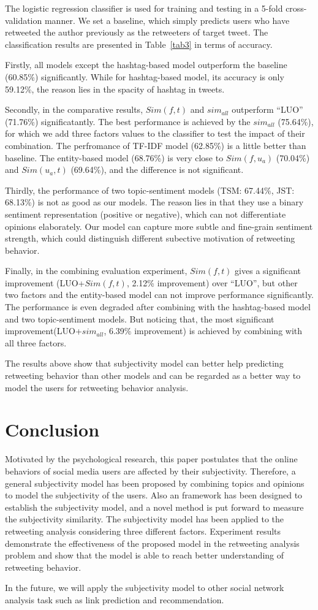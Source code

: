 \documentclass[letterpaper]{article}
\begin{document}
The logistic regression classifier is used for training and testing in a 5-fold cross-validation manner.
We set a baseline, which simply predicts users who have retweeted the author previously as the retweeters of target tweet. 
The classification results are presented in Table~\ref{tab3} in terms of accuracy.

Firstly, all models except the hashtag-based model outperform the baseline (60.85\%) significantly. While for hashtag-based model, its accuracy is only 59.12\%, the reason lies in the spacity of hashtag in tweets. 

Secondly, in the comparative results, $ Sim(f,t) $ and $ sim_{all}  $ outperform ``LUO'' (71.76\%) significatantly.
The best performance is achieved by the $ sim_{all}  $ (75.64\%), for which we add three factors values to the classifier to test the impact of their combination. 
The perfromance of TF-IDF model (62.85\%) is a little better than baseline. 
The entity-based model (68.76\%) is very close to  $ Sim(f,u_a)$ (70.04\%) and $ Sim(u_a,t)  $ (69.64\%), and the difference is not significant.

Thirdly, the performance of two topic-sentiment models (TSM: 67.44\%, JST: 68.13\%) is not as good as our models. The reason lies in that they use a binary sentiment representation (positive or negative), which can not differentiate opinions elaborately. Our model can capture more subtle and fine-grain sentiment strength, which could distinguish different subective motivation of retweeting behavior.

Finally, in the combining evaluation experiment, $ Sim(f,t) $ gives a significant improvement (LUO+$ Sim(f,t) $, 2.12\% improvement) over ``LUO'', but other two factors and the entity-based model can not improve performance significantly. The performance is even degraded after combining with the hashtag-based model and two topic-sentiment models. 
But noticing that, the most significant improvement(LUO+$ sim_{all}  $, 6.39\% improvement) is achieved by combining with all three factors. 

The results above show that subjectivity model can better help predicting retweeting behavior than other models and can be regarded as a better way to model the users for retweeting behavior analysis. 

\section{Conclusion}
Motivated by the psychological research, this paper postulates that the online behaviors of social media users are affected by their subjectivity. Therefore, a general subjectivity model has been proposed by combining topics and opinions to model the subjectivity of the users. Also an framework has been designed to establish the subjectivity model, and a novel method is put forward to measure the subjectivity similarity. The subjectivity model has been applied to the retweeting analysis considering three different factors. 
Experiment results demonstrate the effectiveness of the proposed model in the retweeting analysis problem and show that the model is able to reach better understanding of retweeting behavior. 

In the future, we will apply the subjectivity model to other social network analysis task such as link prediction and recommendation. 



\end{document}
